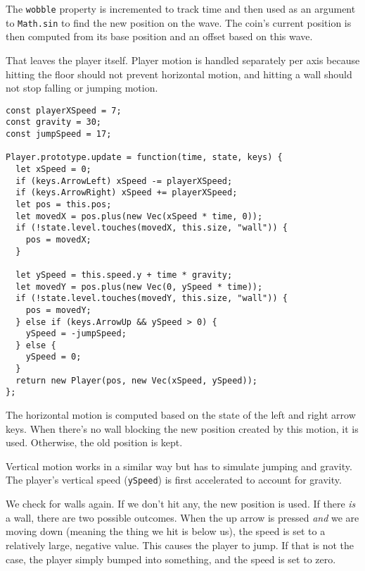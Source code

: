 The \lstinline`wobble` property is incremented to track time and then used as an argument to \lstinline`Math.sin` to find the new position on the wave. The coin's current position is then computed from its base position and an offset based on this wave.

That leaves the player itself. Player motion is handled separately per axis because hitting the floor should not prevent horizontal motion, and hitting a wall should not stop falling or jumping motion.

\begin{lstlisting}
const playerXSpeed = 7;
const gravity = 30;
const jumpSpeed = 17;

Player.prototype.update = function(time, state, keys) {
  let xSpeed = 0;
  if (keys.ArrowLeft) xSpeed -= playerXSpeed;
  if (keys.ArrowRight) xSpeed += playerXSpeed;
  let pos = this.pos;
  let movedX = pos.plus(new Vec(xSpeed * time, 0));
  if (!state.level.touches(movedX, this.size, "wall")) {
    pos = movedX;
  }

  let ySpeed = this.speed.y + time * gravity;
  let movedY = pos.plus(new Vec(0, ySpeed * time));
  if (!state.level.touches(movedY, this.size, "wall")) {
    pos = movedY;
  } else if (keys.ArrowUp && ySpeed > 0) {
    ySpeed = -jumpSpeed;
  } else {
    ySpeed = 0;
  }
  return new Player(pos, new Vec(xSpeed, ySpeed));
};
\end{lstlisting}
\noindent{}

The horizontal motion is computed based on the state of the left and right arrow keys. When there's no wall blocking the new position created by this motion, it is used. Otherwise, the old position is kept.

Vertical motion works in a similar way but has to simulate jumping and gravity. The player's vertical speed (\lstinline`ySpeed`) is first accelerated to account for gravity.

We check for walls again. If we don't hit any, the new position is used. If there \emph{is} a wall, there are two possible outcomes. When the up arrow is pressed \emph{and} we are moving down (meaning the thing we hit is below us), the speed is set to a relatively large, negative value. This causes the player to jump. If that is not the case, the player simply bumped into something, and the speed is set to zero.

